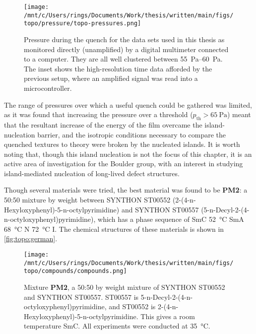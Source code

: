 \documentclass[superscriptaddress,floatfix,draft,prl]{revtex4-1}
\begin{document}
\begin{figure}[h!]
    \centering
    \texttt{[image: /mnt/c/Users/rings/Documents/Work/thesis/written/main/figs/topo/pressure/topo-pressures.png]}
    \caption[Pressure of quench chamber during mechanical quench event.]{\label{fig:topo:quenchPressures} Pressure during the quench for the
        data sets used in this thesis as monitored directly (unamplified) by a
        digital multimeter connected to a computer. They are all well clustered between
    \SIrange{55}{60}{\pascal}. The inset shows the high-resolution time data
afforded by the previous setup, where an amplified signal was read into a
microcontroller.}
\end{figure}


The range of pressures over which a useful quench could be gathered was limited,
as it was found that increasing the pressure over a threshold ($p_\textrm{th} >
\SI{65}{\pascal}$)
meant that the resultant increase of the energy of the film overcame the
island-nucleation barrier, and the isotropic conditions necessary to compare the
quenched textures to theory were broken by the nucleated islands. It is worth
noting that, though this island nucleation is not the focus of this chapter, it
is an active area of investigation for the Boulder group, with an interest in
studying island-mediated nucleation of long-lived defect structures. 



Though several materials were tried, the best material was found to be
\textbf{PM2}: a 50:50 mixture by weight between SYNTHON ST00552
(2-(4-n-Hexyloxyphenyl)-5-n-octylpyrimidine) and SYNTHON ST00557
(5-n-Decyl-2-(4-n-octyloxyphenyl)pyrimidine), which has a phase sequence of SmC
\SI{52}{\degreeCelsius} SmA \SI{68}{\degreeCelsius} N \SI{72}{\degreeCelsius} I. The
chemical structures of these materials is shown in
\autoref{fig:topo:german}\cite{HarthEpisodeslifedeath2016}.

\begin{figure}[h!]
    \centering
    \texttt{[image: /mnt/c/Users/rings/Documents/Work/thesis/written/main/figs/topo/compounds/compounds.png]}
    \caption[Material used in quench experiments.]{\label{fig:topo:german}
        Mixture \textbf{PM2}, a 50:50 by weight mixture of
        SYNTHON ST00552 and SYNTHON ST00557. ST00557 is
        5-n-Decyl-2-(4-n-octyloxyphenyl)pyrimidine, and ST00552 is
    2-(4-n-Hexyloxyphenyl)-5-n-octylpyrimidine. This gives a room temperature
SmC. All experiments were conducted at \SI{35}{\degreeCelsius}.}
\end{figure}
\end{document}
